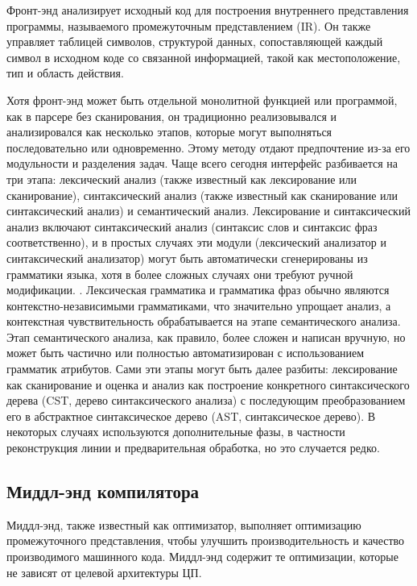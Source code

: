 Фронт-энд анализирует исходный код для построения внутреннего представления программы, называемого промежуточным представлением (IR). Он также управляет таблицей символов, структурой данных, сопоставляющей каждый символ в исходном коде со связанной информацией, такой как местоположение, тип и область действия.

Хотя фронт-энд может быть отдельной монолитной функцией или программой, как в парсере без сканирования, он традиционно реализовывался и анализировался как несколько этапов, которые могут выполняться последовательно или одновременно. Этому методу отдают предпочтение из-за его модульности и разделения задач. Чаще всего сегодня интерфейс разбивается на три этапа: лексический анализ (также известный как лексирование или сканирование), синтаксический анализ (также известный как сканирование или синтаксический анализ) и семантический анализ. Лексирование и синтаксический анализ включают синтаксический анализ (синтаксис слов и синтаксис фраз соответственно), и в простых случаях эти модули (лексический анализатор и синтаксический анализатор) могут быть автоматически сгенерированы из грамматики языка, хотя в более сложных случаях они требуют ручной модификации. . Лексическая грамматика и грамматика фраз обычно являются контекстно-независимыми грамматиками, что значительно упрощает анализ, а контекстная чувствительность обрабатывается на этапе семантического анализа. Этап семантического анализа, как правило, более сложен и написан вручную, но может быть частично или полностью автоматизирован с использованием грамматик атрибутов. Сами эти этапы могут быть далее разбиты: лексирование как сканирование и оценка и анализ как построение конкретного синтаксического дерева (CST, дерево синтаксического анализа) с последующим преобразованием его в абстрактное синтаксическое дерево (AST, синтаксическое дерево). В некоторых случаях используются дополнительные фазы, в частности реконструкция линии и предварительная обработка, но это случается редко. 

\subsection{Миддл-энд компилятора}\label{sec:ch1/sec5/subsec3}

Миддл-энд, также известный как оптимизатор, выполняет оптимизацию промежуточного представления, чтобы улучшить производительность и качество производимого машинного кода. Миддл-энд содержит те оптимизации, которые не зависят от целевой архитектуры ЦП. 

